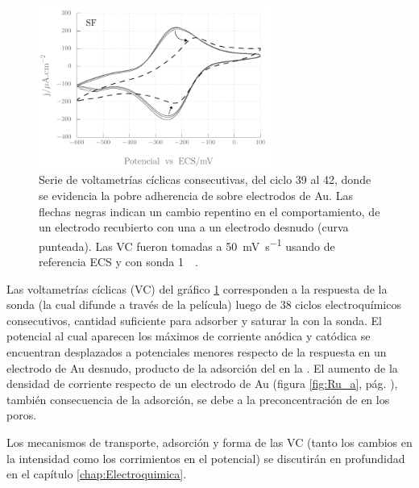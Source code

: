 				\begin{figure}[b!]
				 	   	    \begin{center} 
				        	\includegraphics[width=0.68\textwidth]{Graficos/Adherencia_F127.pdf}
				       		\caption[Adherencia de \pdmF \space sobre una película delgada de Au.]{Serie de voltametrías cíclicas consecutivas, del ciclo 39 al 42, donde se evidencia la pobre adherencia de \pdmF\space sobre electrodos de Au. Las flechas negras indican un cambio repentino en el comportamiento, de un electrodo recubierto con una \pdm\space a un electrodo desnudo (curva punteada). Las VC fueron tomadas a \SI{50}{\milli\volt.\second^{-1}} usando de referencia ECS y con sonda \ru\space \SI{1}{\milli\Molar}.}
				         	\label{fig:adherencia_F127}
				     		\end{center}
				     		\end{figure}

			 Las voltametrías cíclicas (VC) del gráfico \ref{fig:adherencia_F127} corresponden a la respuesta de la sonda \aminorutenio (la cual difunde a través de la película) luego de 38 ciclos electroquímicos consecutivos, cantidad suficiente para adsorber y saturar la \pdm\space con la sonda. El potencial al cual aparecen los máximos de corriente anódica y catódica se encuentran desplazados a potenciales menores respecto de la respuesta en un electrodo de Au desnudo, producto de la adsorción del \aminorutenio\space en la \pdm. El aumento de la densidad de corriente respecto de un electrodo de Au (figura \ref{fig:Ru_a}, pág. \pageref{fig:Ru_a}), también consecuencia de la adsorción, se debe a la preconcentración de \aminorutenio\space en los poros.\cite{Etienne2007,Gimenez2016-2} 

			 Los mecanismos de transporte, adsorción y forma de las VC (tanto los cambios en la intensidad como los corrimientos en el potencial) se discutirán en profundidad en el capítulo \ref{chap:Electroquimica}. 
		
